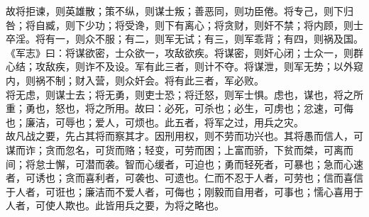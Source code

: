 故将拒谏，则英雄散；策不纵，则谋士叛；善恶同，则功臣倦。将专己，则下归咎；将自臧，则下少功；将受谗，则下有离心；将贪财，则奸不禁；将内顾，则士卒淫。将有一，则众不服；有二，则军无试；有三，则军乖背；有四，则祸及国。\\
《军志》曰：将谋欲密，士众欲一，攻敌欲疾。将谋密，则奸心闭；士众一，则群心结；攻敌疾，则诈不及设。军有此三者，则计不夺。将谋泄，则军无势；以外窥内，则祸不制；财入营，则众奸会。将有此三者，军必败。\\
将无虑，则谋士去；将无勇，则吏士恐；将迁怒，则军士惧。虑也，谋也，将之所重；勇也，怒也，将之所用。故曰：必死，可杀也；必生，可虏也；忿速，可侮也；廉洁，可辱也；爱人，可烦也。此五者，将军之过，用兵之灾。\\
故凡战之要，先占其将而察其才。因刑用权，则不劳而功兴也。其将愚而信人，可谋而诈；贪而忽名，可货而赂；轻变，可劳而困；上富而骄，下贫而桀，可离而间；将怠士懈，可潜而袭。智而心缓者，可迫也；勇而轻死者，可暴也；急而心速者，可诱也；贪而喜利者，可袭也、可遗也。仁而不忍于人者，可劳也；信而喜信于人者，可诳也；廉洁而不爱人者，可侮也；刚毅而自用者，可事也；懦心喜用于人者，可使人欺也。此皆用兵之要，为将之略也。
%
%
